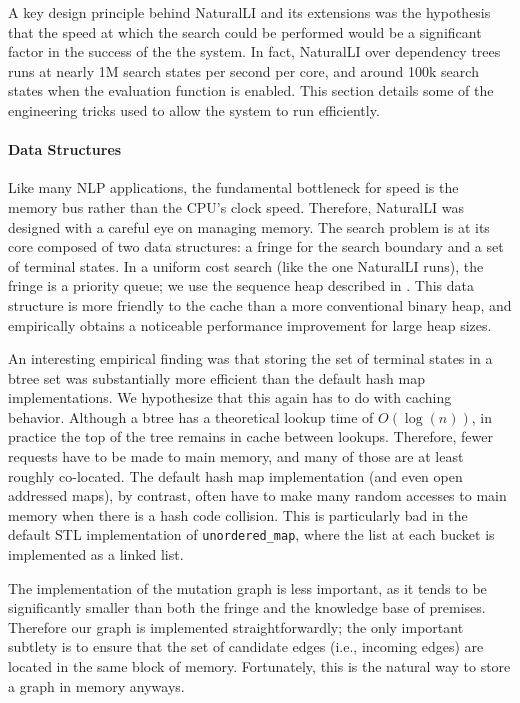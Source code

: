 A key design principle behind NaturalLI and its extensions was the hypothesis
  that the speed at which the search could be performed would be a significant
  factor in the success of the the system.
In fact, NaturalLI over dependency trees runs at nearly 1M search states per
  second per core, and around 100k search states when the evaluation function is enabled.
This section details some of the engineering tricks used to allow the system
  to run efficiently.

\paragraph{Data Structures}
Like many NLP applications, the fundamental bottleneck for speed is the memory bus
  rather than the CPU's clock speed.
Therefore, NaturalLI was designed with a careful eye on managing memory.
The search problem is at its core composed of two data structures: a fringe
  for the search boundary and a set of terminal states.
In a uniform cost search (like the one NaturalLI runs), the fringe is a
  priority queue; we use the sequence heap described in
  .
This data structure is more friendly to the cache than a more conventional binary heap,
  and empirically obtains a noticeable performance improvement for large heap sizes.

An interesting empirical finding was that storing the set of terminal states in a btree
  set was substantially more efficient than the default hash map implementations.
We hypothesize that this again has to do with caching behavior.
Although a btree has a theoretical lookup time of $O(\log(n))$, in practice the top
  of the tree remains in cache between lookups.
Therefore, fewer requests have to be made to main memory, and many of those are at least
  roughly co-located.
The default hash map implementation (and even open addressed maps), by contrast,
   often have to make many random accesses to main memory when there is a hash code
   collision.
This is particularly bad in the default STL implementation of \texttt{unordered\_map},
  where the list at each bucket is implemented as a linked list.

The implementation of the mutation graph is less important, as it tends to be
  significantly smaller than both the fringe and the knowledge base of premises.
Therefore our graph is implemented straightforwardly; the only important subtlety is to ensure
  that the set of candidate edges (i.e., incoming edges) are located in the same block
  of memory.
Fortunately, this is the natural way to store a graph in memory anyways.



